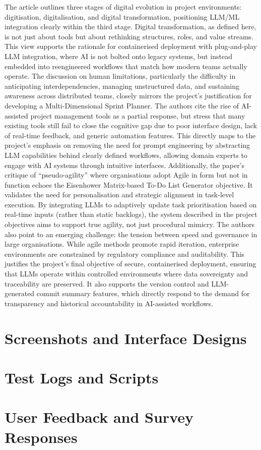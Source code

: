 \documentclass{report}
\begin{document}
The article outlines three stages of digital evolution in project environments: digitisation, digitalisation, and digital transformation, positioning LLM/ML integration clearly within the third stage. Digital transformation, as defined here, is not just about tools but about rethinking structures, roles, and value streams. This view supports the rationale for containerised deployment with plug-and-play LLM integration, where AI is not bolted onto legacy systems, but instead embedded into reengineered workflows that match how modern teams actually operate.
The discussion on human limitations, particularly the difficulty in anticipating interdependencies, managing unstructured data, and sustaining awareness across distributed teams, closely mirrors the project’s justification for developing a Multi-Dimensional Sprint Planner. The authors cite the rise of AI-assisted project management tools as a partial response, but stress that many existing tools still fail to close the cognitive gap due to poor interface design, lack of real-time feedback, and generic automation features. This directly maps to the project’s emphasis on removing the need for prompt engineering by abstracting LLM capabilities behind clearly defined workflows, allowing domain experts to engage with AI systems through intuitive interfaces.
Additionally, the paper’s critique of “pseudo-agility” where organisations adopt Agile in form but not in function echoes the Eisenhower Matrix-based To-Do List Generator objective. It validates the need for personalisation and strategic alignment in task-level execution. By integrating LLMs to adaptively update task prioritisation based on real-time inputs (rather than static backlogs), the system described in the project objectives aims to support true agility, not just procedural mimicry.
The authors also point to an emerging challenge: the tension between speed and governance in large organisations. While agile methods promote rapid iteration, enterprise environments are constrained by regulatory compliance and auditability. This justifies the project’s final objective of secure, containerised deployment, ensuring that LLMs operate within controlled environments where data sovereignty and traceability are preserved. It also supports the version control and LLM-generated commit summary features, which directly respond to the demand for transparency and historical accountability in AI-assisted workflows.

\chapter{Screenshots and Interface Designs}
\chapter{Test Logs and Scripts}
\chapter{User Feedback and Survey Responses}
\end{document}
